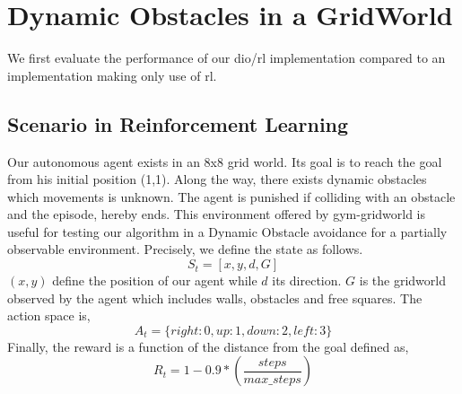 \documentclass[a4paper,11pt]{article}
\theoremstyle{definition}
\begin{document}
\section{Dynamic Obstacles in a GridWorld} 
We first evaluate the performance of our dio/rl implementation compared to an implementation making only use of rl. 
\subsection{Scenario in Reinforcement Learning}
Our autonomous agent exists in an 8x8 grid world. Its goal is to reach the goal from his initial position (1,1).
Along the way, there exists dynamic obstacles which movements is unknown. The agent is punished if colliding with an obstacle and the episode, hereby ends. 
This environment offered by gym-gridworld \cite{gym_minigrid} is useful for testing our algorithm in a Dynamic Obstacle avoidance for a partially observable 
environment. Precisely, we define the state as follows. 
\begin{equation*}
  S_t = [x, y, d, G]
\end{equation*}
$(x,y)$ define the position of our agent while $d$ its direction. $G$ is the gridworld observed by the agent which includes walls, obstacles and free squares. 
The action space is, 
\begin{equation*}
  A_t = \{ right: 0, up: 1, down: 2, left: 3 \}
\end{equation*}
Finally, the reward is a function of the distance from the goal defined as, 
\begin{equation*}
  R_t = 1 - 0.9*(\dfrac{steps}{max\_steps})
\end{equation*}

\medskip
\end{document}
